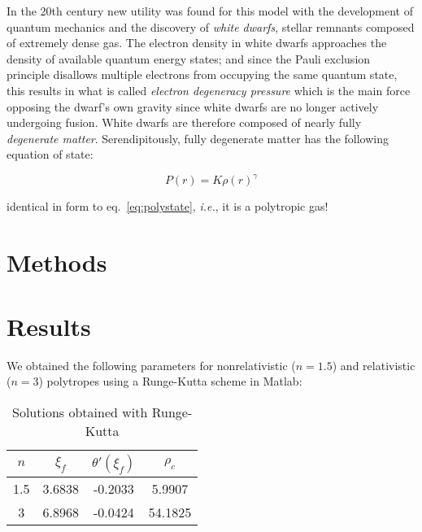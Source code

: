 \documentclass[twoside]{article}
\begin{document}
\begin{multicols}{2}
In the 20th century new utility was found for this model with the development of
quantum mechanics and the discovery of \emph{white dwarfs}, stellar remnants
composed of extremely dense gas. The electron density in white dwarfs approaches
the density of available quantum energy states; and since the Pauli exclusion
principle disallows multiple electrons from occupying the same quantum
state\cite[p.216]{griffithsqm}, this results in what is called \emph{electron
degeneracy pressure}\cite[pp.217-218]{griffithsqm} which is the main force
opposing the dwarf's own gravity since white dwarfs are no longer actively
undergoing fusion. White dwarfs are therefore composed of nearly fully
\emph{degenerate matter}. Serendipitously, fully degenerate matter has the
following equation of state:\cite[pp.163-166]{hansen2004}

    \begin{equation}
        \label{eq:degenstate}
        P(r)=K\rho(r)^{\gamma}
    \end{equation}

identical in form to eq.~\ref{eq:polystate}, \emph{i.e.}, it is a polytropic
gas!


\section{Methods}

\begin{compactitem}
\item 
\end{compactitem}


\section{Results}

We obtained the following parameters for nonrelativistic (\(n=1.5\)) and
relativistic (\(n=3\)) polytropes using a Runge-Kutta scheme in Matlab:

\begin{table}[H]
\caption{Solutions obtained with Runge-Kutta}
\centering
\begin{tabular}{c | c c c}
\toprule
\(n\) & \(\xi_f\) & \(\theta'(\xi_f)\) & \(\rho_c\) \\
\midrule
1.5 & 3.6838 & -0.2033 & 5.9907 \\
3 & 6.8968 & -0.0424 & 54.1825 \\
\bottomrule
\end{tabular}
\end{table}



\end{multicols}
\end{document}
